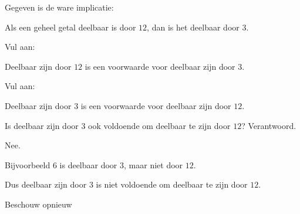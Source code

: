 \documentclass{ximera}
\begin{document}
\begin{oefening}{\oefU\ESS}

Gegeven is de ware implicatie:

\begin{center}
Als een geheel getal deelbaar is door $12$, dan is het deelbaar door $3$.
\end{center}

\begin{question}

Vul aan:

\begin{center}
Deelbaar zijn door $12$ is een  voorwaarde voor deelbaar zijn door $3$.
\end{center}

\end{question}

\begin{question}

Vul aan:

\begin{center}
Deelbaar zijn door $3$ is een  voorwaarde voor deelbaar zijn door $12$.
\end{center}

\end{question}

\begin{question}

Is deelbaar zijn door $3$ ook voldoende om deelbaar te zijn door $12$?
Verantwoord.

\begin{oplossing}

Nee.

Bijvoorbeeld $6$ is deelbaar door $3$, maar niet door $12$.

Dus deelbaar zijn door $3$ is niet voldoende om deelbaar te zijn door
$12$.

\end{oplossing}

\end{question}

\end{oefening}



Beschouw opnieuw
\end{document}
